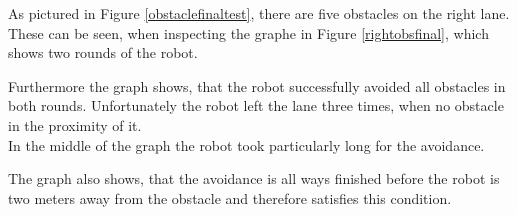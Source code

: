 As pictured in Figure \ref{obstaclefinaltest}, there are five obstacles on the right lane. These can be seen, when inspecting the graphe in Figure \ref{rightobsfinal}, which shows two rounds of the robot.

Furthermore the graph shows, that the robot successfully avoided all obstacles in both rounds. Unfortunately the robot left the lane three times, when no obstacle in the proximity of it.\\

In the middle of the graph the robot took particularly long for the avoidance.

The graph also shows, that the avoidance is all ways finished before the robot is two meters away from the obstacle and therefore satisfies this condition.










